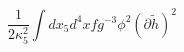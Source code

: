 \begin{equation}
\frac{1}{2\kappa_5^2}\int dx_5 d^4 x fg^{-3} \phi^2 (\partial
\tilde h)^2
\end{equation}

